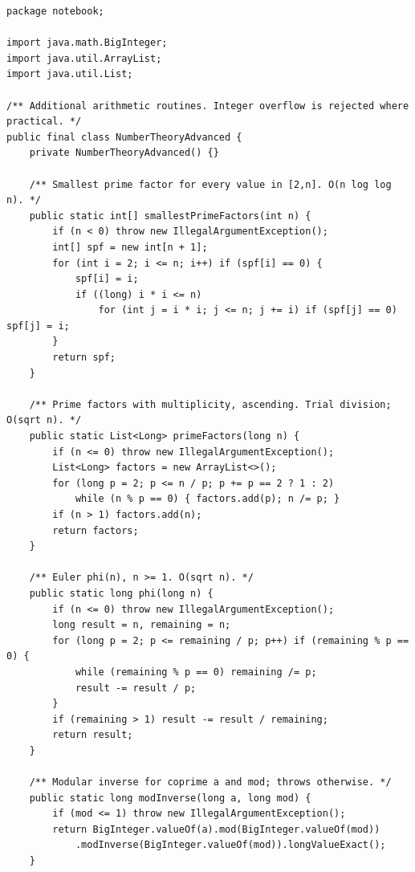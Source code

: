 \documentclass[10pt,letterpaper]{article}
\begin{document}
\begin{lstlisting}
package notebook;

import java.math.BigInteger;
import java.util.ArrayList;
import java.util.List;

/** Additional arithmetic routines. Integer overflow is rejected where practical. */
public final class NumberTheoryAdvanced {
    private NumberTheoryAdvanced() {}

    /** Smallest prime factor for every value in [2,n]. O(n log log n). */
    public static int[] smallestPrimeFactors(int n) {
        if (n < 0) throw new IllegalArgumentException();
        int[] spf = new int[n + 1];
        for (int i = 2; i <= n; i++) if (spf[i] == 0) {
            spf[i] = i;
            if ((long) i * i <= n)
                for (int j = i * i; j <= n; j += i) if (spf[j] == 0) spf[j] = i;
        }
        return spf;
    }

    /** Prime factors with multiplicity, ascending. Trial division; O(sqrt n). */
    public static List<Long> primeFactors(long n) {
        if (n <= 0) throw new IllegalArgumentException();
        List<Long> factors = new ArrayList<>();
        for (long p = 2; p <= n / p; p += p == 2 ? 1 : 2)
            while (n % p == 0) { factors.add(p); n /= p; }
        if (n > 1) factors.add(n);
        return factors;
    }

    /** Euler phi(n), n >= 1. O(sqrt n). */
    public static long phi(long n) {
        if (n <= 0) throw new IllegalArgumentException();
        long result = n, remaining = n;
        for (long p = 2; p <= remaining / p; p++) if (remaining % p == 0) {
            while (remaining % p == 0) remaining /= p;
            result -= result / p;
        }
        if (remaining > 1) result -= result / remaining;
        return result;
    }

    /** Modular inverse for coprime a and mod; throws otherwise. */
    public static long modInverse(long a, long mod) {
        if (mod <= 1) throw new IllegalArgumentException();
        return BigInteger.valueOf(a).mod(BigInteger.valueOf(mod))
            .modInverse(BigInteger.valueOf(mod)).longValueExact();
    }


\end{lstlisting}
\end{document}
